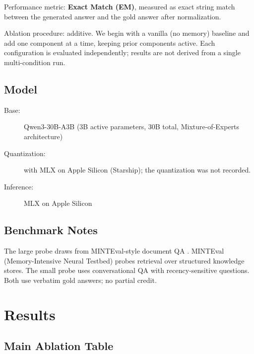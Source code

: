 \documentclass[11pt,a4paper]{article}
\begin{document}
Performance metric: \textbf{Exact Match (EM)}, measured as exact string match between the generated answer and the gold answer after normalization.

Ablation procedure: additive. We begin with a vanilla (no memory) baseline and add one component at a time, keeping prior components active. Each configuration is evaluated independently; results are not derived from a single multi-condition run.

\subsection{Model}

\begin{description}
  \item[Base:] Qwen3-30B-A3B (3B active parameters, 30B total, Mixture-of-Experts architecture)
  \item[Quantization:] with MLX on Apple Silicon (Starship); the quantization was not recorded.
  \item[Inference:] MLX on Apple Silicon
\end{description}

\subsection{Benchmark Notes}

The large probe draws from MINTEval-style document QA \cite{minteval}. MINTEval (Memory-Intensive Neural Testbed) probes retrieval over structured knowledge stores. The small probe uses conversational QA with recency-sensitive questions. Both use verbatim gold answers; no partial credit.

\section{Results}

\subsection{Main Ablation Table}
\end{document}
